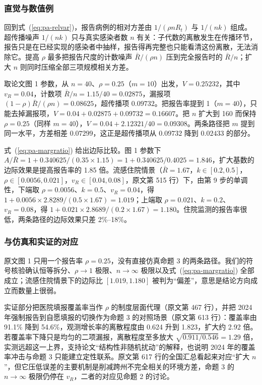 \subsubsection{直觉与数值例}

回到式~(\ref{eq:pa-relvar})，报告病例的相对方差由 $1/(\rho nR_t)$ 与 $1/(nk)$ 组成。超传播噪声 $1/(nk)$ 只与真实感染者数 $n$ 有关：子代数的离散发生在传播环节，报告只是在已经实现的感染者中抽样，报告得再完整也只能看清这份离散，无法消除它。提高 $\rho$ 最多把报告尺度的计数噪声 $\bar R/(\rho n)$ 压到完全报告时的 $\bar R/n$；扩大 $n$ 则同时压缩全部三项规模相关方差。

取论文图 1 参数，从 $n=40$、$\rho=0.25$（$m=10$）出发，$V=0.25232$，其中 $v_R=0.04$，计数项 $\bar R/n=1.15/40=0.02875$，漏报项 $(1-\rho)\bar R/(\rho n)=0.08625$，超传播项 $0.09732$。把报告率提到 1（$m=40$），只能去掉漏报项，$V=0.04+0.02875+0.09732=0.16607$。把 $n$ 扩大到 160 而保持 $\rho=0.25$（同样 $m=40$），$V=0.04+2.12321/40=0.09308$。两条路径把 $m$ 提到同一水平，方差相差 $0.07299$，这正是超传播项从 $0.09732$ 降到 $0.02433$ 的部分。

式~(\ref{eq:pa-margratio}) 给出边际比较。图 1 参数下 $A/\bar R=1+0.340625/(0.35\times1.15)=1+0.340625/0.4025=1.846$，扩大基数的边际效果是提高报告率的 1.85 倍。流感住院情景（$\bar R=1.67$，$k\in[0.2,0.5]$，$\rho\in[0.0056,0.021]$，$v_R\in[0.04,0.08]$，原文第 515 行）下，由第 9 步的单调性，下端取 $\rho=0.0056$、$k=0.5$、$v_R=0.04$，得 $1+0.0056\times2.8289/(0.5\times1.67)=1.019$；上端取 $\rho=0.021$、$k=0.2$、$v_R=0.08$，得 $1+0.021\times2.8689/(0.2\times1.67)=1.180$。住院监测的报告率很低，两条路径的边际效果只差 2\%--18\%。

\subsubsection{与仿真和实证的对应}

原文图 1 只用一个报告率 $\rho=0.25$，没有直接仿真命题 3 的两条路径。我们的符号核验确认恒等拆分、$\rho\to1$ 极限、$n\to\infty$ 极限以及式~(\ref{eq:pa-margratio}) 全部成立；流感住院情景下的边际比 $[1.019,1.180]$ 被判为“偏差”，意思是结论方向成立而数量上很弱。

实证部分把医院填报覆盖率当作 $\rho$ 的制度层面代理（原文第 467 行），并把 2024 年强制报告到自愿填报的切换作为命题 3 的对照场景（原文第 613 行）：覆盖率由 91.1\% 降到 54.6\%，观测增长率的离散程度由 0.624 升到 1.823，扩大约 2.92 倍。若覆盖率下降只是均匀的二项漏报，离散程度至多放大 $\sqrt{0.911/0.546}=1.29$ 倍，实测远超这一上界，支持论文“结构性非随机扰动”的解释，也说明 2024 年的覆盖率冲击与命题 3 只能建立定性联系。原文第 617 行的全国汇总看起来对应“扩大 $n$”，但它压低误差的主要机制是削减跨州不完全相关的环境方差，命题 3 的 $n\to\infty$ 极限仍停在 $v_R$，二者的对应见命题 2 的讨论。

